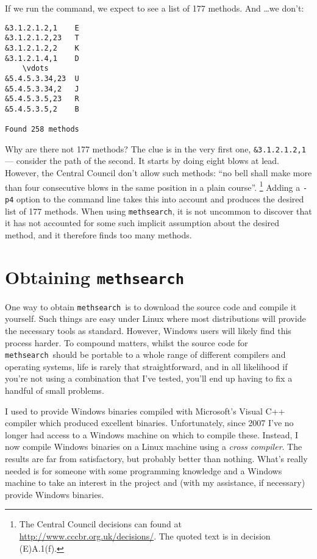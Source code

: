 \documentclass[a4paper,11pt,oneside]{book}
\makeatletter
\def\textitidx#1{\textit{#1}\index{#1}}
\newcommand{\oi}[1]{\index{#1@{\hspace*{-\optwidth}\texttt{-}\texttt{#1}}}}
\def\methsearch{\texttt{meth\-search}}
\makeatother
\begin{document}
If we run the command, we expect to see a list of 177 methods. 
And \ldots we don't:

\begin{Verbatim}[obeytabs=true,commandchars=\\\{\}]
&3.1.2.1.2,1	E
&3.1.2.1.2,23	T
&3.1.2.1.2,2	K
&3.1.2.1.4,1	D
	\vdots
&5.4.5.3.34,23	U
&5.4.5.3.34,2	J
&5.4.5.3.5,23	R
&5.4.5.3.5,2	B

Found 258 methods
\end{Verbatim}

Why are there not 177 methods?  The clue is in the very first one,
\verb+&3.1.2.1.2,1+ --- consider the path of the second.  It starts 
by doing eight blows at lead.  However, the Central Council don't allow
such methods: ``no bell shall make more than 
four consecutive blows in the same position in a plain course''.%
\footnote{The Central Council decisions can found at 
\url{http://www.cccbr.org.uk/decisions/}.
The quoted text is in decision (E)A.1(f).}
Adding a \verb+-p4+ option\oi{p} to the command line takes this into account
and produces the desired list of 177 methods.  
When using \methsearch, it is not uncommon to discover that it has not
accounted for some such implicit assumption about the desired method, 
and it therefore finds too many methods.


\section{Obtaining \methsearch}\label{obtain}

One way to obtain \methsearch\ is to download the source code and
compile it yourself.  Such things are easy under Linux where most 
distributions will provide the necessary tools as standard.  However,
Windows users will likely find this process harder.  To compound matters,
whilst the source code for \methsearch\ should be portable to a whole 
range of different compilers and operating systems, life is rarely that 
straightforward, and in all likelihood if you're not using a combination
that I've tested, you'll end up having to fix a handful of small problems.

I used to provide Windows binaries compiled with Microsoft's 
Visual C++ compiler which produced excellent
binaries.  Unfortunately, since 2007 I've no longer had access to a Windows
machine on which to compile these.  Instead, I now compile Windows binaries
on a Linux machine using a \textitidx{cross compiler}.  The results are far
from satisfactory, but probably better than nothing.  What's    
really needed is for someone with some programming knowledge and a Windows      
machine to take an interest in the project and (with my assistance, 
if necessary) provide Windows binaries.
\end{document}
